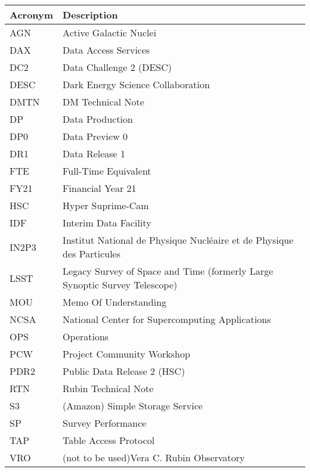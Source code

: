 \addtocounter{table}{-1}
\begin{longtable}{p{}p{}}\hline
\textbf{Acronym} & \textbf{Description}  \\\hline

AGN & Active Galactic Nuclei \\\hline
DAX & Data Access Services \\\hline
DC2 & Data Challenge 2 (DESC) \\\hline
DESC & Dark Energy Science Collaboration \\\hline
DMTN & DM Technical Note \\\hline
DP & Data Production \\\hline
DP0 & Data Preview 0 \\\hline
DR1 & Data Release 1 \\\hline
FTE & Full-Time Equivalent \\\hline
FY21 & Financial Year 21 \\\hline
HSC & Hyper Suprime-Cam \\\hline
IDF & Interim Data Facility \\\hline
IN2P3 & Institut National de Physique Nucléaire et de Physique des Particules \\\hline
LSST & Legacy Survey of Space and Time (formerly Large Synoptic Survey Telescope) \\\hline
MOU & Memo Of Understanding \\\hline
NCSA & National Center for Supercomputing Applications \\\hline
OPS & Operations \\\hline
PCW & Project Community Workshop \\\hline
PDR2 & Public Data Release 2 (HSC) \\\hline
RTN & Rubin Technical Note \\\hline
S3 & (Amazon) Simple Storage Service  \\\hline
SP & Survey Performance \\\hline
TAP & Table Access Protocol \\\hline
VRO & (not to be used)Vera C. Rubin Observatory \\\hline
\end{longtable}
